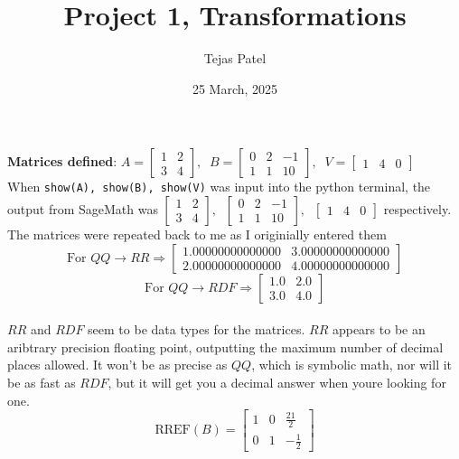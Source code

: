 \documentclass{article}
\title{Project 1, Transformations}
\date{25 March, 2025}
\author{Tejas Patel}
\begin{document}
\maketitle
\section{}
\textbf{Matrices defined}: $A=\begin{bmatrix}1&2\\3&4\end{bmatrix},\;\;B=\begin{bmatrix}0&2&-1\\1&1&10\end{bmatrix},\;\; V=\begin{bmatrix}1&4&0\end{bmatrix}$
\\[0.1in]When \verb+show(A), show(B), show(V)+ was input into the python terminal, the output from SageMath was $\begin{bmatrix}1&2\\3&4\end{bmatrix},\;\;\begin{bmatrix}0&2&-1\\1&1&10\end{bmatrix},\;\; \begin{bmatrix}1&4&0\end{bmatrix}$ respectively. The matrices were repeated back to me as I originially entered them
\\[0.01in]$$\text{For }QQ \rightarrow RR \Rightarrow \begin{bmatrix}1.00000000000000&3.00000000000000\\2.00000000000000&4.00000000000000\end{bmatrix}$$ 
$$\text{For }QQ \rightarrow RDF  \Rightarrow \begin{bmatrix}1.0 & 2.0 \\3.0 & 4.0\end{bmatrix}$$ 
\\[0.1in] $RR$ and $RDF$ seem to be data types for the matrices. $RR$ appears to be an aribtrary precision floating point, outputting the maximum number of decimal places allowed. It won't be as precise as $QQ$, which is symbolic math, nor will it be as fast as $RDF$, but it will get you a decimal answer when youre looking for one.
\\[0.1in]$$\text{RREF}(B)=\begin{bmatrix}
    1 & 0 & \frac{21}{2} \\
0 & 1 & -\frac{1}{2}
\end{bmatrix}$$
\end{document}
